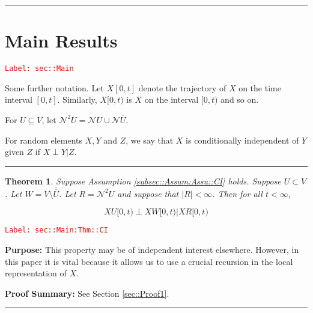 \documentclass[12pt]{article}
\newcommand{\mc}{\mathcal}
\newcommand{\ov}{\overline}
\newcommand{\tr}{\textcolor{red}}
\newcommand{\labe}[1]{\tr{\texttt{Label: #1}}}
\newcommand{\purpose}{\textbf{Purpose: }}
\newcommand{\pfsum}{\textbf{Proof Summary: }}
\newcommand{\ind}{\hspace{24pt}}
\newcommand{\lin}{\rule{\linewidth}{0.4 pt}}
\renewcommand{\U}{U}							%
\newcommand{\UU}{W}								%
\newcommand{\UUU}{R}							%
\renewcommand{\t}{t}							%
\newcommand{\X}{X}								%
\newcommand{\neigh}{\mc{N}}						%
\newcommand{\dneigh}{\mc{N}^2}					%
\newcommand{\XX}{Y}								%
\newcommand{\XXX}{Z}							%
\newtheorem{thms}{Theorem}[section]
\begin{document}
\lin
\section{Main Results}
\label{sec::Main}\labe{sec::Main}

Some further notation. Let \(\X{}{[0,\t]}\) denote the trajectory of \(\X{}{}\) on the time interval \([0,\t]\). Similarly, \(\X{}{[0,\t)}\) is \(\X{}{}\) on the interval \([0,\t)\) and so on.

\ind For \(\U \subseteq V\), let \(\dneigh{\U} = \neigh{\U} \cup \neigh{\ov{\U}}\). 

\ind For random elements \(\X{}{},\XX{}{}\) and \(\XXX{}{}\), we say that \(\X{}{}\) is conditionally independent of \(\XX{}{}\) given \(\XXX{}{}\) if \(\X{}{}\perp\XX{}{}|\XXX{}{}\).

\lin

\begin{thms}
Suppose Assumption \ref{subsec::Assum:Assu::CI} holds. Suppose \(\U \subset V\). Let \(\UU =V\setminus \ov{\ov{\U}}\). Let \(\UUU= \dneigh{U}\) and suppose that \(|\UUU| < \infty\). Then for all \(\t < \infty\),

\[\X{\U}{[0,\t)}\perp \X{\UU}{[0,\t)}|\X{\UUU}{[0,\t)}\]
\label{sec::Main:Thm::CI}
\end{thms}
\labe{sec::Main:Thm::CI}

\purpose This property may be of independent interest elsewhere. However, in this paper it is vital because it allows us to use a crucial recursion in the local representation of \(\X{}{}\).

\pfsum See Section \ref{sec::Proof1}.

\lin
\end{document}
